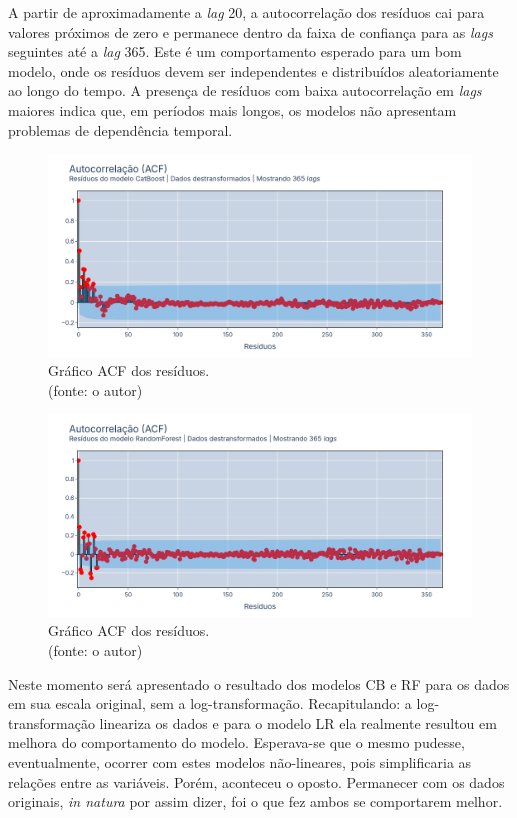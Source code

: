 A partir de aproximadamente a \textit{lag} 20, a autocorrelação dos resíduos cai para valores próximos de zero e permanece dentro da faixa de confiança para as \textit{lags} seguintes até a \textit{lag} 365. Este é um comportamento esperado para um bom modelo, onde os resíduos devem ser independentes e distribuídos aleatoriamente ao longo do tempo. A presença de resíduos com baixa autocorrelação em \textit{lags} maiores indica que, em períodos mais longos, os modelos não apresentam problemas de dependência temporal.

\begin{figure}[!h]
\centering
\includegraphics[scale=0.33]{Figuras/jequiti/resultados/CB_WFV_LOG_RESID_ACF.png}
\caption{Gráfico ACF dos resíduos.\\(fonte: o autor)}
\label{fig:jequiti_CB_WFV_LOG_RESID_ACF}
\end{figure}

\begin{figure}[!h]
\centering
\includegraphics[scale=0.33]{Figuras/jequiti/resultados/RF_WFV_LOG_RESID_ACF.png}
\caption{Gráfico ACF dos resíduos.\\(fonte: o autor)}
\label{fig:jequiti_RF_WFV_LOG_RESID_ACF}
\end{figure}
\clearpage

Neste momento será apresentado o resultado dos modelos CB e RF para os dados em sua escala original, sem a log-transformação. Recapitulando: a log-transformação lineariza os dados e para o modelo LR ela realmente resultou em melhora do comportamento do modelo. Esperava-se que o mesmo pudesse, eventualmente, ocorrer com estes modelos não-lineares, pois simplificaria as relações entre as variáveis. Porém, aconteceu o oposto. Permanecer com os dados originais, \textit{in natura} por assim dizer, foi o que fez ambos se comportarem melhor.

